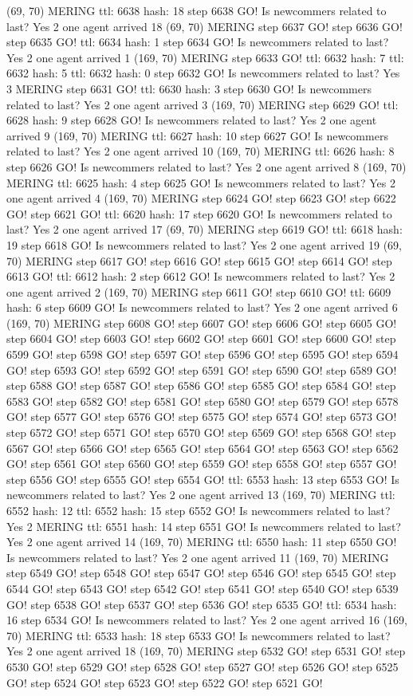 (69, 70) MERING ttl: 6638 hash: 18 step 6638 GO! Is newcommers related to last? Yes 2 one agent arrived 18 (69, 70) MERING step 6637 GO! step 6636 GO! step 6635 GO! ttl: 6634 hash: 1 step 6634 GO! Is newcommers related to last? Yes 2 one agent arrived 1 (169, 70) MERING step 6633 GO! ttl: 6632 hash: 7 ttl: 6632 hash: 5 ttl: 6632 hash: 0 step 6632 GO! Is newcommers related to last? Yes 3 MERING step 6631 GO! ttl: 6630 hash: 3 step 6630 GO! Is newcommers related to last? Yes 2 one agent arrived 3 (169, 70) MERING step 6629 GO! ttl: 6628 hash: 9 step 6628 GO! Is newcommers related to last? Yes 2 one agent arrived 9 (169, 70) MERING ttl: 6627 hash: 10 step 6627 GO! Is newcommers related to last? Yes 2 one agent arrived 10 (169, 70) MERING ttl: 6626 hash: 8 step 6626 GO! Is newcommers related to last? Yes 2 one agent arrived 8 (169, 70) MERING ttl: 6625 hash: 4 step 6625 GO! Is newcommers related to last? Yes 2 one agent arrived 4 (169, 70) MERING step 6624 GO! step 6623 GO! step 6622 GO! step 6621 GO! ttl: 6620 hash: 17 step 6620 GO! Is newcommers related to last? Yes 2 one agent arrived 17 (69, 70) MERING step 6619 GO! ttl: 6618 hash: 19 step 6618 GO! Is newcommers related to last? Yes 2 one agent arrived 19 (69, 70) MERING step 6617 GO! step 6616 GO! step 6615 GO! step 6614 GO! step 6613 GO! ttl: 6612 hash: 2 step 6612 GO! Is newcommers related to last? Yes 2 one agent arrived 2 (169, 70) MERING step 6611 GO! step 6610 GO! ttl: 6609 hash: 6 step 6609 GO! Is newcommers related to last? Yes 2 one agent arrived 6 (169, 70) MERING step 6608 GO! step 6607 GO! step 6606 GO! step 6605 GO! step 6604 GO! step 6603 GO! step 6602 GO! step 6601 GO! step 6600 GO! step 6599 GO! step 6598 GO! step 6597 GO! step 6596 GO! step 6595 GO! step 6594 GO! step 6593 GO! step 6592 GO! step 6591 GO! step 6590 GO! step 6589 GO! step 6588 GO! step 6587 GO! step 6586 GO! step 6585 GO! step 6584 GO! step 6583 GO! step 6582 GO! step 6581 GO! step 6580 GO! step 6579 GO! step 6578 GO! step 6577 GO! step 6576 GO! step 6575 GO! step 6574 GO! step 6573 GO! step 6572 GO! step 6571 GO! step 6570 GO! step 6569 GO! step 6568 GO! step 6567 GO! step 6566 GO! step 6565 GO! step 6564 GO! step 6563 GO! step 6562 GO! step 6561 GO! step 6560 GO! step 6559 GO! step 6558 GO! step 6557 GO! step 6556 GO! step 6555 GO! step 6554 GO! ttl: 6553 hash: 13 step 6553 GO! Is newcommers related to last? Yes 2 one agent arrived 13 (169, 70) MERING ttl: 6552 hash: 12 ttl: 6552 hash: 15 step 6552 GO! Is newcommers related to last? Yes 2 MERING ttl: 6551 hash: 14 step 6551 GO! Is newcommers related to last? Yes 2 one agent arrived 14 (169, 70) MERING ttl: 6550 hash: 11 step 6550 GO! Is newcommers related to last? Yes 2 one agent arrived 11 (169, 70) MERING step 6549 GO! step 6548 GO! step 6547 GO! step 6546 GO! step 6545 GO! step 6544 GO! step 6543 GO! step 6542 GO! step 6541 GO! step 6540 GO! step 6539 GO! step 6538 GO! step 6537 GO! step 6536 GO! step 6535 GO! ttl: 6534 hash: 16 step 6534 GO! Is newcommers related to last? Yes 2 one agent arrived 16 (169, 70) MERING ttl: 6533 hash: 18 step 6533 GO! Is newcommers related to last? Yes 2 one agent arrived 18 (169, 70) MERING step 6532 GO! step 6531 GO! step 6530 GO! step 6529 GO! step 6528 GO! step 6527 GO! step 6526 GO! step 6525 GO! step 6524 GO! step 6523 GO! step 6522 GO! step 6521 GO! 